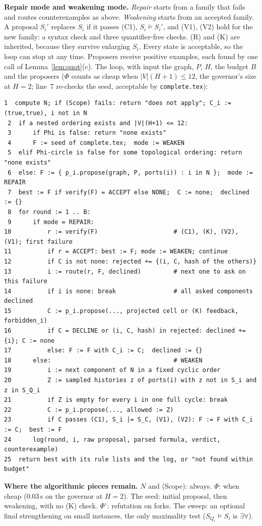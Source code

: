 \documentclass[10pt]{article}
\theoremstyle{tplain}\newtheorem{theorem}{Theorem}\newtheorem{lemma}[theorem]{Lemma}\newtheorem{proposition}[theorem]{Proposition}\newtheorem{corollary}[theorem]{Corollary}\newtheorem{claim}[theorem]{Claim}
\theoremstyle{tdef}\newtheorem{definition}[theorem]{Definition}
\begin{document}
\textbf{Repair mode and weakening mode.} \emph{Repair} starts from a family that fails and routes counterexamples as above. \emph{Weakening} starts from an accepted family. A proposal $S_i'$ replaces $S_i$ if it passes (C1), $S_i\models S_i'$, and (V1), (V2) hold for the new family: a syntax check and three quantifier-free checks. (R) and (K) are inherited, because they survive enlarging $S_i$. Every state is acceptable, so the loop can stop at any time. Proposers receive positive examples, each found by one call of Lemma~\ref{lem:quot}(c). The loop, with input the graph, $P$, $H$, the budget $B$ and the proposers ($\Phi$ counts as cheap when $|V|(H+1)\le12$, the governor's size at $H=2$; line~7 re-checks the seed, acceptable by \texttt{complete.tex}):
\begin{Verbatim}[fontsize=\normalsize]
 1  compute N; if (Scope) fails: return "does not apply"; C_i := (true,true), i not in N
 2  if a nested ordering exists and |V|(H+1) <= 12:
 3      if Phi is false: return "none exists"
 4      F := seed of complete.tex;  mode := WEAKEN
 5  elif Phi-circle is false for some topological ordering: return "none exists"
 6  else: F := { p_i.propose(graph, P, ports(i)) : i in N };  mode := REPAIR
 7  best := F if verify(F) = ACCEPT else NONE;  C := none;  declined := {}
 8  for round := 1 .. B:
 9      if mode = REPAIR:
10          r := verify(F)                     # (C1), (K), (V2), (V1); first failure
11          if r = ACCEPT: best := F; mode := WEAKEN; continue
12          if C is not none: rejected += {(i, C, hash of the others)}
13          i := route(r, F, declined)         # next one to ask on this failure
14          if i is none: break                # all asked components declined
15          C := p_i.propose(..., projected cell or (K) feedback, forbidden_i)
16          if C = DECLINE or (i, C, hash) in rejected: declined += {i}; C := none
17          else: F := F with C_i := C;  declined := {}
18      else:                                  # WEAKEN
19          i := next component of N in a fixed cyclic order
20          Z := sampled histories z of ports(i) with z not in S_i and z in S_Q_i
21          if Z is empty for every i in one full cycle: break
22          C := p_i.propose(..., allowed := Z)
23          if C passes (C1), S_i |= S_C, (V1), (V2): F := F with C_i := C;  best := F
24      log(round, i, raw proposal, parsed formula, verdict, counterexample)
25  return best with its rule lists and the log, or "not found within budget"
\end{Verbatim}
\textbf{Where the algorithmic pieces remain.} $N$ and (Scope): always. $\Phi$: when cheap (0.03\,s on the governor at $H=2$). The seed: initial proposal, then weakening, with no (K) check. $\Phi^\circ$: refutation on forks. The sweep: an optional final strengthening on small instances, the only maximality test ($S_{Q_i}\models S_i$ is $\exists\forall$).
\end{document}

